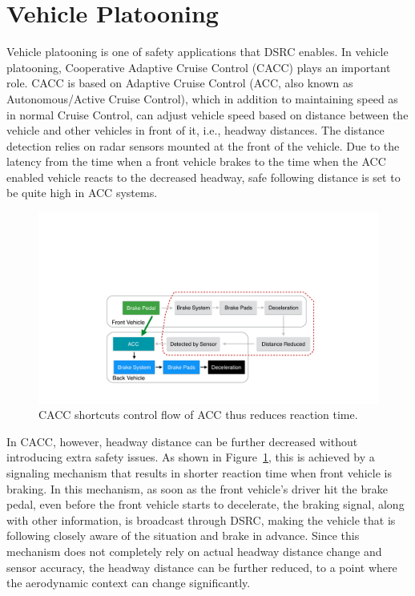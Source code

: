 \documentclass[12pt]{report}
\begin{document}
\section{Vehicle Platooning}
\label{sec:vehicle_platooning}

Vehicle platooning is one of safety applications that DSRC enables. In vehicle platooning, Cooperative Adaptive Cruise Control (CACC) plays an important role. CACC is based on Adaptive Cruise Control (ACC, also known as Autonomous/Active Cruise Control), which in addition to maintaining speed as in normal Cruise Control, can adjust vehicle speed based on distance between the vehicle and other vehicles in front of it, i.e., headway distances. The distance detection relies on radar sensors mounted at the front of the vehicle. Due to the latency from the time when a front vehicle brakes to the time when the ACC enabled vehicle reacts to the decreased headway, safe following distance is set to be quite high in ACC systems.

\begin{figure}[htb]
  \begin{center}
    \includegraphics[width=.7\columnwidth]{figures/brake.pdf}
    \caption{\label{fig:brake}CACC shortcuts control flow of ACC thus reduces reaction time.}
  \end{center}
\end{figure}

In CACC, however, headway distance can be further decreased without introducing extra safety issues. As shown in Figure~\ref{fig:brake}, this is achieved by a signaling mechanism that results in shorter reaction time when front vehicle is braking. In this mechanism, as soon as the front vehicle's driver hit the brake pedal, even before the front vehicle starts to decelerate, the braking signal, along with other information, is broadcast through DSRC, making the vehicle that is following closely aware of the situation and brake in advance. Since this mechanism does not completely rely on actual headway distance change and sensor accuracy, the headway distance can be further reduced, to a point where the aerodynamic context can change significantly.
\end{document}
